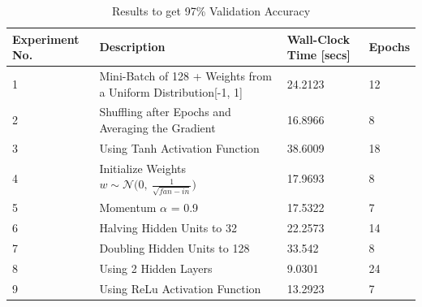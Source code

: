 \documentclass{article} %
\begin{document}
{{\renewcommand{\arraystretch}{1.5}
\begin{table}[h!]
\centering
\caption{Results to get 97\% Validation Accuracy}
\label{my-label}
\begin{tabular}{|p{2cm}|p{6cm}|p{2cm}|p{1.5cm}|}
\hline
\textbf{Experiment No.}            & \textbf{Description}                                                          & \textbf{Wall-Clock Time [secs]} & \textbf{Epochs} \\ \hline
1 & Mini-Batch of 128 + Weights from a Uniform Distribution{[}-1, 1{]} & 24.2123                                              & 12                                  \\ \hline
2 & Shuffling after Epochs and Averaging the Gradient                                         & 16.8966                                              & 8                                  \\ \hline
3 & Using Tanh Activation Function                                                            & 38.6009 	 & 18                                  \\ \hline
4 & Initialize Weights $w \sim \mathcal{N} \bigg(0, \  \frac{1}{\sqrt{fan-in}} \bigg)     $ & 17.9693                                              & 8                                   \\ \hline
5 & Momentum $\alpha$ = 0.9                                                                     & 17.5322 & 7                                   \\ \hline
6 & Halving Hidden Units to 32                                                                &  22.2573 & 14                                  \\ \hline
7 & Doubling Hidden Units to 128                                                              & 33.542 & 8                                   \\ \hline
8 & Using 2 Hidden Layers                                                                     & 9.0301                                               & 24                                    \\ \hline
9 & Using ReLu Activation Function                                                       & 13.2923 & 7                                    \\ \hline
\end{tabular}
\end{table}

}}
\end{document}
